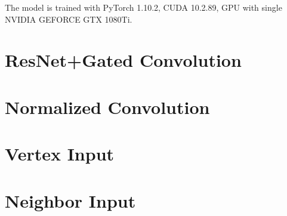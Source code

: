 The model is trained with PyTorch 1.10.2, CUDA 10.2.89, GPU with single NVIDIA GEFORCE GTX 1080Ti.


\section{ResNet+Gated Convolution}


\section{Normalized Convolution}



\section{Vertex Input}



\section{Neighbor Input}
